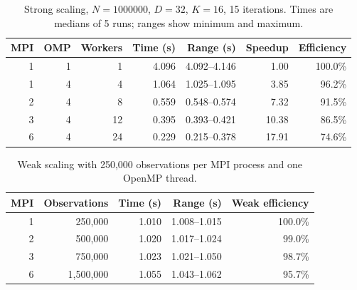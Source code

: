 \begin{table}[H]\centering\small
\caption{Strong scaling, $N=1000000$, $D=32$, $K=16$, 15 iterations. Times are medians of 5 runs; ranges show minimum and maximum.}
\begin{tabular}{rrrrrrr}\toprule
MPI & OMP & Workers & Time (s) & Range (s) & Speedup & Efficiency \\
\midrule
1 & 1 & 1 & 4.096 & 4.092--4.146 & 1.00 & 100.0\% \\
1 & 4 & 4 & 1.064 & 1.025--1.095 & 3.85 & 96.2\% \\
2 & 4 & 8 & 0.559 & 0.548--0.574 & 7.32 & 91.5\% \\
3 & 4 & 12 & 0.395 & 0.393--0.421 & 10.38 & 86.5\% \\
6 & 4 & 24 & 0.229 & 0.215--0.378 & 17.91 & 74.6\% \\
\bottomrule\end{tabular}\label{tab:hpc-strong}\end{table}
\begin{table}[H]\centering\small
\caption{Weak scaling with 250,000 observations per MPI process and one OpenMP thread.}
\begin{tabular}{rrrrr}\toprule
MPI & Observations & Time (s) & Range (s) & Weak efficiency \\
\midrule
1 & 250,000 & 1.010 & 1.008--1.015 & 100.0\% \\
2 & 500,000 & 1.020 & 1.017--1.024 & 99.0\% \\
3 & 750,000 & 1.023 & 1.021--1.050 & 98.7\% \\
6 & 1,500,000 & 1.055 & 1.043--1.062 & 95.7\% \\
\bottomrule\end{tabular}\label{tab:hpc-weak}\end{table}
